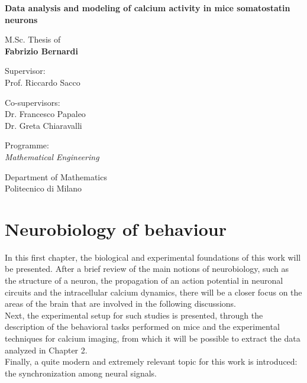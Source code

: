 \documentclass[a4paper]{article}
\newcommand{\myName}{Fabrizio Bernardi}
\newcommand{\myTitle}{Data analysis and modeling of calcium activity in   mice somatostatin neurons}
\newcommand{\myDegree}{Programme: \protect\\ \textit{Mathematical Engineering}}
\newcommand{\myDepartment}{Department of Mathematics}
\newcommand{\myUni}{Politecnico di Milano}
\begin{document}
\begin{titlepage}
\begin{minipage}{\linewidth}
\begin{minipage}{0.45\linewidth}
\begin{figure}[H]
				\end{figure}
			\end{minipage}
		\end{minipage}
		
		\begin{addmargin}[1cm]{-1cm}
			\setlength{\parindent}{0pt}
			\vfill
			
			{\huge\bfseries\myTitle}
			
			\vspace{2cm}
			
			{\Large M.Sc. Thesis of\\[0.125cm]}
			{\LARGE\bfseries\myName}
			
			\vspace{1cm}
			
			\large
			Supervisor:\\[0.125cm]
			{\Large Prof. Riccardo Sacco}
			
			\vspace{0.5cm}
			
			\large
			Co-supervisors:\\[0.125cm]
			{\Large Dr. Francesco Papaleo \\
			Dr. Greta Chiaravalli}
			
			\vspace{2cm}
			
			\myDegree
			
			\vspace{0.5cm}
			
			\myDepartment \\
			\myUni
			
			\vfill
		\end{addmargin}
	\end{titlepage}
	
	\tableofcontents
	
	\newpage
	
	\section{Neurobiology of behaviour}
	
	
	In this first chapter, the biological and experimental foundations of this work will be presented. After a brief review of the main notions of neurobiology, such as the structure of a neuron, the propagation of an action potential in neuronal circuits and the intracellular calcium dynamics, there will be a closer focus on the areas of the brain that are involved in the following discussions.\\
	Next, the experimental setup for such studies is presented, through the description of the behavioral tasks performed on mice and the experimental techniques for calcium imaging, from which it will be possible to extract the data analyzed in Chapter 2.\\
	Finally, a  quite modern and extremely relevant topic for this work is introduced: the synchronization among neural signals.
	
\end{document}
